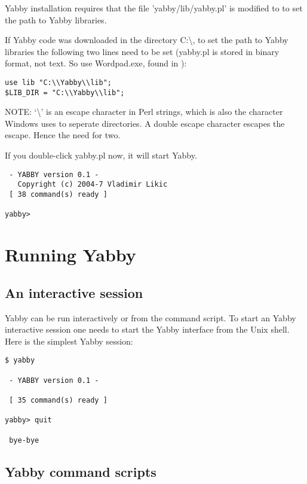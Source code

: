 Yabby installation requires that the file 'yabby/lib/yabby.pl' is modified to
to set the path to Yabby libraries.

If Yabby code was downloaded in the directory C:{\backslash}, to set
the path to Yabby libraries the following two lines need to be set (yabby.pl
is stored in binary format, not text. So use Wordpad.exe, found in
{}):
\begin{verbatim}
use lib "C:\\Yabby\\lib";
$LIB_DIR = "C:\\Yabby\\lib";
\end{verbatim}
NOTE: `{\backslash}' is an escape character in Perl strings, which is
also the character Windows uses to seperate directories. A double escape
character escapes the escape. Hence the need for two.

If you double-click yabby.pl now, it will start Yabby.
\begin{verbatim}
 - YABBY version 0.1 - 
   Copyright (c) 2004-7 Vladimir Likic
 [ 38 command(s) ready ]

yabby>
\end{verbatim}


\section{Running Yabby}

\subsection{An interactive session}

Yabby can be run interactively or from the command script. To
start an Yabby interactive session one needs to start the Yabby
interface from the Unix shell. Here is the simplest Yabby session:

\begin{verbatim}
$ yabby

 - YABBY version 0.1 - 

 [ 35 command(s) ready ]

yabby> quit

 bye-bye
\end{verbatim}

\subsection{Yabby command scripts}

